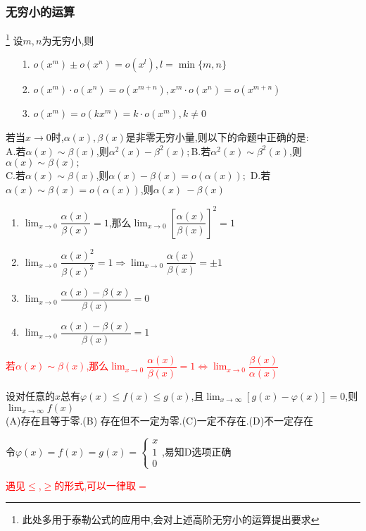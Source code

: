 \documentclass[8pt a4paper, oneside, UTF8]{ctexbook}
\begin{document}
\begin{sloppypar}
    \subsubsection{无穷小的运算}\footnote{此处多用于泰勒公式的应用中,会对上述高阶无穷小的运算提出要求}
    设$m,n$为无穷小,则
    \begin{itemize}
        \item[1.] $o(x^{m})\pm o(x^{n})=o(x^{l}),l=\min\{m,n\}$
        \item[2.] $o(x^{m})\cdot o(x^{n})=o(x^{m+n}),x^{m}\cdot o(x^{n})=o(x^{m+n})$
        \item[3.] $o(x^{m})=o(kx^{m})=k\cdot o(x^{m}),k \neq 0$
    \end{itemize}
    \begin{problem}
    若当$x\to0$时,$\alpha(x),\beta(x)$是非零无穷小量,则以下的命题中正确的是:\\
    A.若$\alpha(x)\sim\beta(x)$,则$\alpha^2(x)-\beta^2(x);$\quad B.若$\alpha^2(x)\sim\beta^2(x)$,则$\alpha(x)\sim\beta(x);$ \\ C.若$\alpha(x)\sim\beta(x)$,则$\alpha(x)-\beta(x)=o(\alpha(x));$ \quad D.若$\alpha(x) \sim \beta(x)=o(\alpha(x))$,则$\alpha(x)~-\beta(x)$
    \end{problem}
    \begin{solution}
        \begin{enumerate}
            \item $\lim_{x \to 0}\dfrac{\alpha(x)}{\beta(x)}=1$,那么$\lim_{x \to 0}[\dfrac{\alpha(x)}{\beta(x)}]^2=1$
            \item $\lim_{x\to 0}\dfrac{\alpha(x)^2}{\beta(x)^2}=1 \Rightarrow \lim_{x \to 0}\dfrac{\alpha(x)}{\beta(x)} = \pm 1$
            \item $\lim_{x \to 0}\dfrac{\alpha(x)-\beta(x)}{\beta(x)}=0$
            \item $\lim_{x\to 0}\dfrac{\alpha(x)-\beta(x)}{\beta(x)}=1$
        \end{enumerate}
    \end{solution}
    \begin{note}
        \textcolor{red}{若$\alpha(x) \sim \beta (x)$,那么$\lim_{x \to 0}\dfrac{\alpha(x)}{\beta(x)}=1 \Leftrightarrow \lim_{x\to 0}\dfrac{\beta(x)}{\alpha(x)}$}
    \end{note}
    \begin{problem}
    设对任意的$x$总有$\varphi(x)\leqslant f(x)\leqslant g(x)$,且$\lim_{x\to \infty}[g(x)-\varphi(x)]=0$,则$\lim_{x\to \infty}f(x)$\\
    (A)存在且等于零.\quad (B) 存在但不一定为零.\quad(C)一定不存在.\quad(D)不一定存在
    \end{problem}
    \begin{solution}
        令$\varphi(x)=f(x)=g(x)=\begin{cases} x\\1\\0 \end{cases}$,易知D选项正确
    \end{solution}
    \begin{note}
        \textcolor{red}{遇见$\leq$,$\geq$的形式,可以一律取$=$}
    \end{note}

\end{sloppypar}
\end{document}
